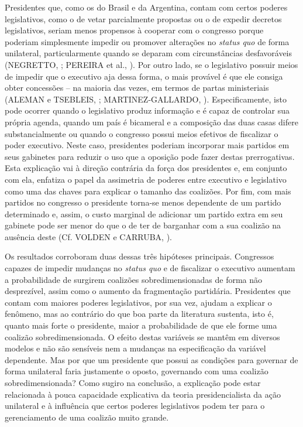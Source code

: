 Presidentes que, como os do Brasil e da Argentina, contam com certos poderes legislativos, como o de vetar parcialmente propostas ou o de expedir decretos legislativos, seriam menos propensos à cooperar com o congresso porque poderiam simplesmente impedir ou promover alterações no \textit{status quo} de forma unilateral, particularmente quando se deparam com circunstâncias desfavoráveis (NEGRETTO, \citeyear{negretto2006}; PEREIRA et al., \citeyear{pereira2005}). Por outro lado, se o legislativo possuir meios de impedir que o executivo aja dessa forma, o mais provável é que ele consiga obter concessões -- na maioria das vezes, em termos de partas ministeriais (ALEMAN e TSEBLEIS, \citeyear{aleman2011}; MARTINEZ-GALLARDO, \citeyear{martinez2012}). Especificamente, isto pode ocorrer quando o legislativo produz informação e é capaz de controlar sua própria agenda, quando um país é bicameral e a composição das duas casas difere substancialmente ou quando o congresso possui meios efetivos de fiscalizar o poder executivo. Neste caso, presidentes poderiam incorporar mais partidos em seus gabinetes para reduzir o uso que a oposição pode fazer destas prerrogativas. Esta explicação vai à direção contrária da força dos presidentes e, em conjunto com ela, enfatiza o papel da assimetria de poderes entre executivo e legislativo como uma das chaves para explicar o tamanho das coalizões. Por fim, com mais partidos no congresso o presidente torna-se menos dependente de um partido determinado e, assim, o custo marginal de adicionar um partido extra em seu gabinete pode ser menor do que o de ter de barganhar com a sua coalizão na ausência deste (Cf. VOLDEN e CARRUBA, \citeyear{volden2004}).

Os resultados corroboram duas dessas três hipóteses principais. Congressos capazes de impedir mudanças no \textit{status quo} e de fiscalizar o executivo aumentam a probabilidade de surgirem coalizões sobredimensionadas de forma não desprezível, assim como o aumento da fragmentação partidária. Presidentes que contam com maiores poderes legislativos, por sua vez, ajudam a explicar o fenômeno, mas ao contrário do que boa parte da literatura sustenta, isto é, quanto mais forte o presidente, maior a probabilidade de que ele forme uma coalizão sobredimensionada. O efeito destas variáveis se mantêm em diversos modelos e não são sensíveis nem a mudanças na especificação da variável dependente. Mas por que um presidente que possui as condições para governar de forma unilateral faria justamente o oposto, governando com uma coalizão sobredimensionada? Como sugiro na conclusão, a explicação pode estar relacionada à pouca capacidade explicativa da teoria presidencialista da ação unilateral e à influência que certos poderes legislativos podem ter para o gerenciamento de uma coalizão muito grande.

